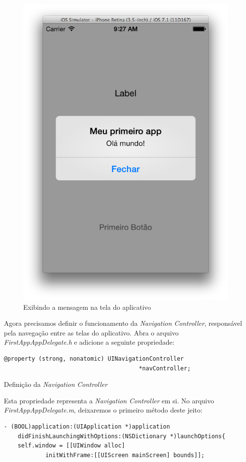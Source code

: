 \documentclass[a4paper,12pt,brazil,doubleside]{book}
\begin{document}
\begin{singlespace}
\begin{figure}[H]
  \centering
  \includegraphics[width=.55\textwidth]{figuras/3/tela_novo_projeto_25.png}
  \caption{Exibindo a mensagem na tela do aplicativo}
  \label{fig:a}
\end{figure}


Agora precisamos definir o funcionamento da \emph{Navigation Controller}, responsável pela navegação entre as telas do aplicativo. Abra o arquivo \emph{FirstAppAppDelegate.h} e adicione a seguinte propriedade:

\begin{listing}
\begin{verbatim}
@property (strong, nonatomic) UINavigationController
									   *navController;
\end{verbatim}
\caption{Definição da \emph{Navigation Controller}}
\end{listing}


Esta propriedade representa a \emph{Navigation Controller} em si. No arquivo \emph{FirstAppAppDelegate.m}, deixaremos o primeiro método deste jeito:

\begin{listing}[H]
\begin{verbatim}
- (BOOL)application:(UIApplication *)application 
	didFinishLaunchingWithOptions:(NSDictionary *)launchOptions{
    self.window = [[UIWindow alloc] 
    		initWithFrame:[[UIScreen mainScreen] bounds]];


\end{verbatim}
\end{listing}
\end{singlespace}
\end{document}
